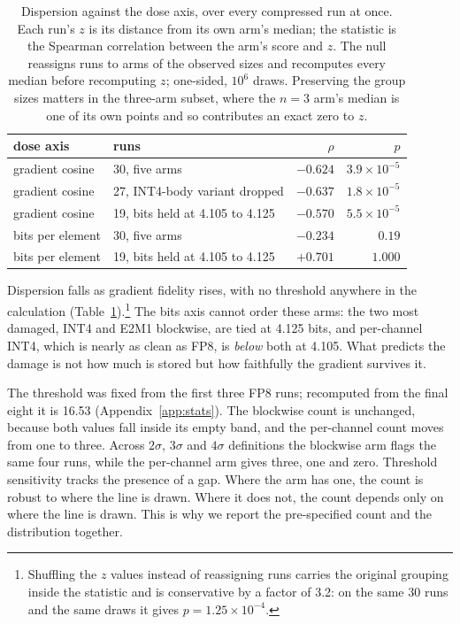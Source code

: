 \documentclass[11pt,letterpaper]{article}
\begin{document}
\begin{table}[htbp]
\centering
\small
\caption{Dispersion against the dose axis, over every compressed run at once. Each run's $z$ is its distance from its own arm's median; the statistic is the Spearman correlation between the arm's score and $z$. The null reassigns runs to arms of the observed sizes and recomputes every median before recomputing $z$; one-sided, $10^6$ draws. Preserving the group sizes matters in the three-arm subset, where the $n{=}3$ arm's median is one of its own points and so contributes an exact zero to $z$.}
\label{tab:dose_trend}
\begin{tabular}{llrr}
\toprule
dose axis & runs & $\rho$ & $p$ \\
\midrule
gradient cosine  & 30, five arms                    & $-0.624$ & $3.9\times10^{-5}$ \\
gradient cosine  & 27, INT4-body variant dropped    & $-0.637$ & $1.8\times10^{-5}$ \\
gradient cosine  & 19, bits held at 4.105 to 4.125  & $-0.570$ & $5.5\times10^{-5}$ \\
bits per element & 30, five arms                    & $-0.234$ & $0.19$ \\
bits per element & 19, bits held at 4.105 to 4.125  & $+0.701$ & $1.000$ \\
\bottomrule
\end{tabular}
\end{table}

Dispersion falls as gradient fidelity rises, with no threshold anywhere in the calculation (Table~\ref{tab:dose_trend}).\footnote{Shuffling the $z$ values instead of reassigning runs carries the original grouping inside the statistic and is conservative by a factor of 3.2: on the same 30 runs and the same draws it gives $p = 1.25\times10^{-4}$.} The bits axis cannot order these arms: the two most damaged, INT4 and E2M1 blockwise, are tied at 4.125 bits, and per-channel INT4, which is nearly as clean as FP8, is \emph{below} both at 4.105. What predicts the damage is not how much is stored but how faithfully the gradient survives it.


The threshold was fixed from the first three FP8 runs; recomputed from the final eight it is 16.53 (Appendix~\ref{app:stats}). The blockwise count is unchanged, because both values fall inside its empty band, and the per-channel count moves from one to three. Across $2\sigma$, $3\sigma$ and $4\sigma$ definitions the blockwise arm flags the same four runs, while the per-channel arm gives three, one and zero. Threshold sensitivity tracks the presence of a gap. Where the arm has one, the count is robust to where the line is drawn. Where it does not, the count depends only on where the line is drawn. This is why we report the pre-specified count and the distribution together.
\end{document}
